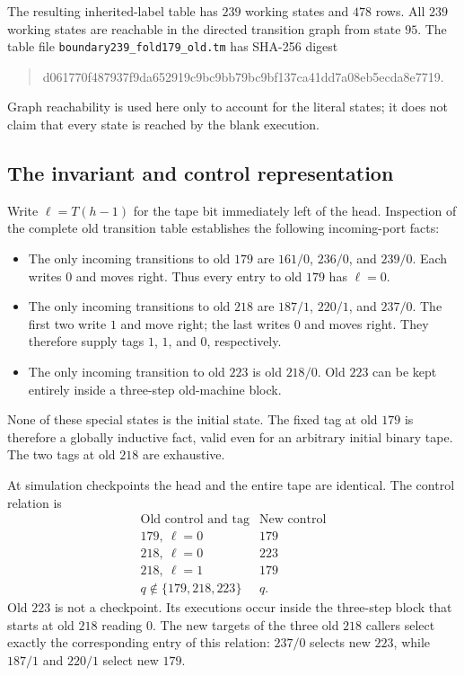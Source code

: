 The resulting inherited-label table has $239$ working states and $478$
rows.  All $239$ working states are reachable in the directed transition
graph from state $95$.  The table file
\texttt{boundary239\_fold179\_old.tm} has SHA-256 digest
\begin{quote}\small\ttfamily
d061770f487937f9da652919c9bc9bb79bc9bf137ca41dd7a08eb5ecda8e7719.
\end{quote}
Graph reachability is used here only to account for the literal states;
it does not claim that every state is reached by the blank execution.

\subsection{The invariant and control representation}

Write $\ell=T(h-1)$ for the tape bit immediately left of the head.
Inspection of the complete old transition table establishes the
following incoming-port facts:
\begin{itemize}
\item The only incoming transitions to old $179$ are
$161/0$, $236/0$, and $239/0$.  Each writes $0$ and moves right.
Thus every entry to old $179$ has $\ell=0$.
\item The only incoming transitions to old $218$ are $187/1$,
$220/1$, and $237/0$.  The first two write $1$ and move right;
the last writes $0$ and moves right.  They therefore supply tags
$1$, $1$, and $0$, respectively.
\item The only incoming transition to old $223$ is old $218/0$.
Old $223$ can be kept entirely inside a three-step old-machine block.
\end{itemize}
None of these special states is the initial state.  The fixed tag at
old $179$ is therefore a globally inductive fact, valid even for an
arbitrary initial binary tape.  The two tags at old $218$ are exhaustive.

At simulation checkpoints the head and the entire tape are identical.
The control relation is
\[
\begin{array}{c|c}
\text{Old control and tag} & \text{New control} \\
\hline
179,\ \ell=0 & 179\\
218,\ \ell=0 & 223\\
218,\ \ell=1 & 179\\
q\notin\{179,218,223\} & q.
\end{array}
\]
Old $223$ is not a checkpoint.  Its executions occur inside the
three-step block that starts at old $218$ reading $0$.
The new targets of the three old $218$ callers select exactly the
corresponding entry of this relation: $237/0$ selects new $223$,
while $187/1$ and $220/1$ select new $179$.


